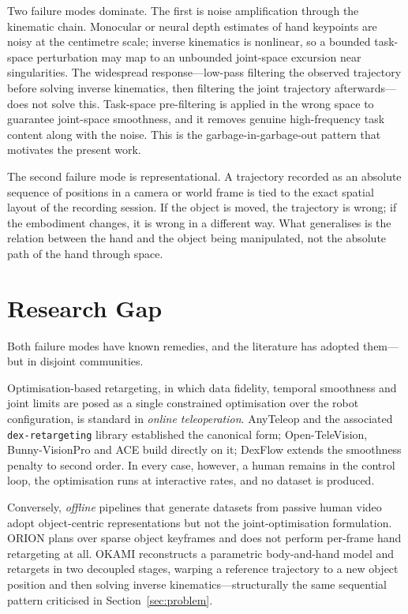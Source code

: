 Two failure modes dominate. The first is noise amplification through the
kinematic chain. Monocular or neural depth estimates of hand keypoints are
noisy at the centimetre scale; inverse kinematics is nonlinear, so a bounded
task-space perturbation may map to an unbounded joint-space excursion near
singularities. The widespread response---low-pass filtering the observed
trajectory before solving inverse kinematics, then filtering the joint
trajectory afterwards---does not solve this. Task-space pre-filtering is
applied in the wrong space to guarantee joint-space smoothness, and it removes
genuine high-frequency task content along with the noise. This is the
garbage-in-garbage-out pattern that motivates the present work.

The second failure mode is representational. A trajectory recorded as an
absolute sequence of positions in a camera or world frame is tied to the exact
spatial layout of the recording session. If the object is moved, the trajectory
is wrong; if the embodiment changes, it is wrong in a different way. What
generalises is the relation between the hand and the object being manipulated,
not the absolute path of the hand through space.

\section{Research Gap}
\label{sec:gap}

Both failure modes have known remedies, and the literature has adopted them---
but in disjoint communities.

Optimisation-based retargeting, in which data fidelity, temporal smoothness and
joint limits are posed as a single constrained optimisation over the robot
configuration, is standard in \emph{online teleoperation}. AnyTeleop and the
associated \texttt{dex-retargeting} library established the canonical form;
Open-TeleVision, Bunny-VisionPro and ACE build directly on it; DexFlow extends
the smoothness penalty to second order. In every case, however, a human remains
in the control loop, the optimisation runs at interactive rates, and no dataset
is produced.

Conversely, \emph{offline} pipelines that generate datasets from passive human
video adopt object-centric representations but not the joint-optimisation
formulation. ORION plans over sparse object keyframes and does not perform
per-frame hand retargeting at all. OKAMI reconstructs a parametric body-and-hand
model and retargets in two decoupled stages, warping a reference trajectory to
a new object position and then solving inverse kinematics---structurally the
same sequential pattern criticised in Section~\ref{sec:problem}.

